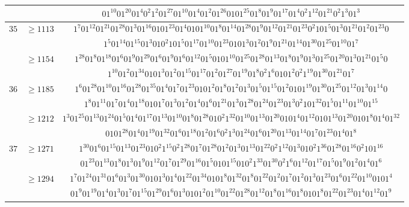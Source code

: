 \documentclass[final,3p,times]{elsarticle}
\theoremstyle{definition}
\begin{document}
\begin{appendix}
{\begin{longtable}[c]{|c|c|c|}
&& $01^{10}01^{20}01^{4}0^{2}1^{2}01^{27}01^{10}01^{4}01^{2}01^{26}0101^{25}01^{8}01^{9}01^{17}01^{4}0^{2}1^{12}01^{21}0^{2}1^{3}01^{3}$\\
\hline
$35$ & $\geq 1113$ & $1^{7}01^{12}01^{21}01^{28}01^{3}01^{16}0101^{23}01^{4}0101^{10}01^{8}01^{14}01^{28}01^{9}01^{12}01^{21}01^{23}0^{2}101^{5}01^{3}01^{21}01^{2}01^{23}0$\\[-2ex]
&& $1^{5}01^{14}01^{15}01^{3}010^{2}101^{5}01^{17}01^{10}01^{23}0101^{3}01^{2}01^{9}01^{21}01^{14}01^{30}01^{25}01^{10}01^{7}$\\[-1ex]
& $\geq 1154$ & $1^{28}01^{8}01^{18}01^{6}01^{9}01^{29}01^{6}01^{9}01^{6}01^{12}01^{5}0101^{10}01^{25}01^{28}01^{13}01^{8}01^{9}01^{3}01^{25}01^{20}01^{3}01^{21}01^{5}0$\\[-2ex]
&& $1^{10}01^{2}01^{34}0101^{3}01^{2}01^{15}01^{17}01^{2}01^{27}01^{19}01^{8}0^{2}1^{6}0101^{2}0^{2}1^{19}01^{30}01^{21}01^{7}$\\
\hline
$36$ & $\geq 1185$ & $1^{6}01^{28}01^{10}01^{16}01^{28}01^{35}01^{4}01^{7}01^{23}0101^{2}01^{8}01^{2}01^{3}01^{5}01^{15}01^{2}0101^{19}01^{30}01^{25}01^{12}01^{3}01^{14}0$\\[-2ex]
&& $1^{8}01^{11}01^{7}01^{4}01^{18}0101^{7}01^{3}01^{2}01^{4}01^{6}01^{21}01^{3}01^{28}01^{24}01^{23}01^{3}0^{2}101^{32}01^{5}01^{11}01^{10}01^{15}$\\[-1ex]
& $\geq 1212$ & $1^{3}01^{25}01^{13}01^{24}01^{5}01^{4}01^{17}01^{13}01^{10}01^{8}01^{28}010^{2}1^{32}01^{10}01^{13}01^{20}0101^{4}01^{12}0101^{13}01^{20}0101^{8}01^{4}01^{32}$\\[-2ex]
&& $0101^{28}01^{4}01^{19}01^{32}01^{6}01^{18}01^{2}01^{6}0^{2}1^{3}01^{24}01^{6}01^{20}01^{13}01^{14}01^{7}01^{23}01^{4}01^{8}$\\
\hline
$37$ & $\geq 1271$ & $1^{30}01^{6}01^{15}01^{13}01^{23}010^{2}1^{15}0^{2}1^{28}01^{7}01^{28}01^{2}01^{3}01^{13}01^{22}0^{2}1^{12}01^{3}010^{2}1^{36}01^{28}01^{16}0^{2}101^{16}$\\[-2ex]
&& $01^{23}01^{13}01^{8}01^{3}01^{9}01^{12}01^{7}01^{29}01^{16}01^{5}0101^{15}010^{2}1^{33}01^{30}0^{2}1^{6}01^{12}01^{17}01^{5}01^{9}01^{2}01^{4}01^{6}$\\[-1ex]
& $\geq 1294$ & $1^{7}01^{24}01^{31}01^{6}01^{3}01^{30}0101^{3}01^{4}01^{22}01^{34}0101^{8}01^{32}01^{8}01^{22}01^{2}01^{7}01^{2}01^{3}01^{23}01^{6}01^{22}01^{10}0101^{4}$\\[-2ex]
&& $01^{9}01^{19}01^{4}01^{3}01^{7}01^{15}01^{29}01^{6}01^{3}0101^{2}01^{10}01^{22}01^{28}01^{12}01^{8}01^{16}01^{8}0101^{8}01^{22}01^{23}01^{4}01^{12}01^{9}$\\

\end{longtable}}
\end{appendix}
\end{document}
